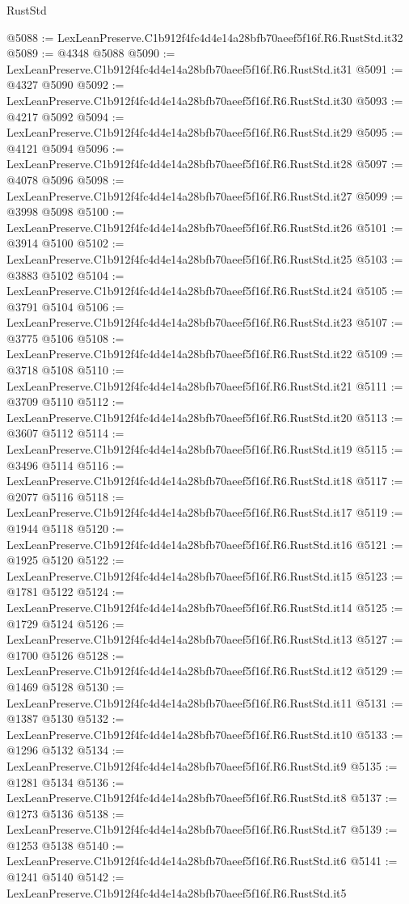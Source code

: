 \begin{lexlean}{RustStd}
\begin{coremodule}
@5088 := LexLeanPreserve.C1b912f4fc4d4e14a28bfb70aeef5f16f.R6.RustStd.it32
@5089 := @4348 @5088
@5090 := LexLeanPreserve.C1b912f4fc4d4e14a28bfb70aeef5f16f.R6.RustStd.it31
@5091 := @4327 @5090
@5092 := LexLeanPreserve.C1b912f4fc4d4e14a28bfb70aeef5f16f.R6.RustStd.it30
@5093 := @4217 @5092
@5094 := LexLeanPreserve.C1b912f4fc4d4e14a28bfb70aeef5f16f.R6.RustStd.it29
@5095 := @4121 @5094
@5096 := LexLeanPreserve.C1b912f4fc4d4e14a28bfb70aeef5f16f.R6.RustStd.it28
@5097 := @4078 @5096
@5098 := LexLeanPreserve.C1b912f4fc4d4e14a28bfb70aeef5f16f.R6.RustStd.it27
@5099 := @3998 @5098
@5100 := LexLeanPreserve.C1b912f4fc4d4e14a28bfb70aeef5f16f.R6.RustStd.it26
@5101 := @3914 @5100
@5102 := LexLeanPreserve.C1b912f4fc4d4e14a28bfb70aeef5f16f.R6.RustStd.it25
@5103 := @3883 @5102
@5104 := LexLeanPreserve.C1b912f4fc4d4e14a28bfb70aeef5f16f.R6.RustStd.it24
@5105 := @3791 @5104
@5106 := LexLeanPreserve.C1b912f4fc4d4e14a28bfb70aeef5f16f.R6.RustStd.it23
@5107 := @3775 @5106
@5108 := LexLeanPreserve.C1b912f4fc4d4e14a28bfb70aeef5f16f.R6.RustStd.it22
@5109 := @3718 @5108
@5110 := LexLeanPreserve.C1b912f4fc4d4e14a28bfb70aeef5f16f.R6.RustStd.it21
@5111 := @3709 @5110
@5112 := LexLeanPreserve.C1b912f4fc4d4e14a28bfb70aeef5f16f.R6.RustStd.it20
@5113 := @3607 @5112
@5114 := LexLeanPreserve.C1b912f4fc4d4e14a28bfb70aeef5f16f.R6.RustStd.it19
@5115 := @3496 @5114
@5116 := LexLeanPreserve.C1b912f4fc4d4e14a28bfb70aeef5f16f.R6.RustStd.it18
@5117 := @2077 @5116
@5118 := LexLeanPreserve.C1b912f4fc4d4e14a28bfb70aeef5f16f.R6.RustStd.it17
@5119 := @1944 @5118
@5120 := LexLeanPreserve.C1b912f4fc4d4e14a28bfb70aeef5f16f.R6.RustStd.it16
@5121 := @1925 @5120
@5122 := LexLeanPreserve.C1b912f4fc4d4e14a28bfb70aeef5f16f.R6.RustStd.it15
@5123 := @1781 @5122
@5124 := LexLeanPreserve.C1b912f4fc4d4e14a28bfb70aeef5f16f.R6.RustStd.it14
@5125 := @1729 @5124
@5126 := LexLeanPreserve.C1b912f4fc4d4e14a28bfb70aeef5f16f.R6.RustStd.it13
@5127 := @1700 @5126
@5128 := LexLeanPreserve.C1b912f4fc4d4e14a28bfb70aeef5f16f.R6.RustStd.it12
@5129 := @1469 @5128
@5130 := LexLeanPreserve.C1b912f4fc4d4e14a28bfb70aeef5f16f.R6.RustStd.it11
@5131 := @1387 @5130
@5132 := LexLeanPreserve.C1b912f4fc4d4e14a28bfb70aeef5f16f.R6.RustStd.it10
@5133 := @1296 @5132
@5134 := LexLeanPreserve.C1b912f4fc4d4e14a28bfb70aeef5f16f.R6.RustStd.it9
@5135 := @1281 @5134
@5136 := LexLeanPreserve.C1b912f4fc4d4e14a28bfb70aeef5f16f.R6.RustStd.it8
@5137 := @1273 @5136
@5138 := LexLeanPreserve.C1b912f4fc4d4e14a28bfb70aeef5f16f.R6.RustStd.it7
@5139 := @1253 @5138
@5140 := LexLeanPreserve.C1b912f4fc4d4e14a28bfb70aeef5f16f.R6.RustStd.it6
@5141 := @1241 @5140
@5142 := LexLeanPreserve.C1b912f4fc4d4e14a28bfb70aeef5f16f.R6.RustStd.it5

\end{coremodule}
\end{lexlean}
